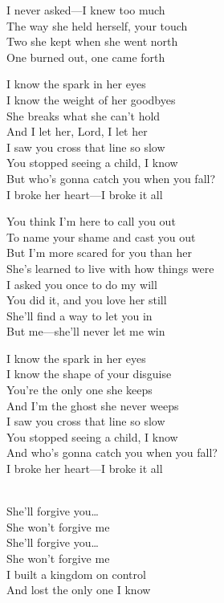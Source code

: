 \begin{lyrics}
I never asked—I knew too much\\  
The way she held herself, your touch\\  
Two she kept when she went north\\  
One burned out, one came forth  

I know the spark in her eyes\\  
I know the weight of her goodbyes\\  
She breaks what she can't hold\\  
And I let her, Lord, I let her\\  
I saw you cross that line so slow\\  
You stopped seeing a child, I know\\  
But who's gonna catch you when you fall?\\  
I broke her heart—I broke it all  

You think I'm here to call you out\\  
To name your shame and cast you out\\  
But I'm more scared for you than her\\  
She's learned to live with how things were\\  
I asked you once to do my will\\  
You did it, and you love her still\\  
She'll find a way to let you in\\  
But me—she'll never let me win  

I know the spark in her eyes\\  
I know the shape of your disguise\\  
You're the only one she keeps\\  
And I'm the ghost she never weeps\\  
I saw you cross that line so slow\\  
You stopped seeing a child, I know\\  
And who's gonna catch you when you fall?\\  
I broke her heart—I broke it all  

\\
She'll forgive you…\\  
She won't forgive me\\  
She'll forgive you…\\  
She won't forgive me\\  
I built a kingdom on control\\  
And lost the only one I know
\end{lyrics}


